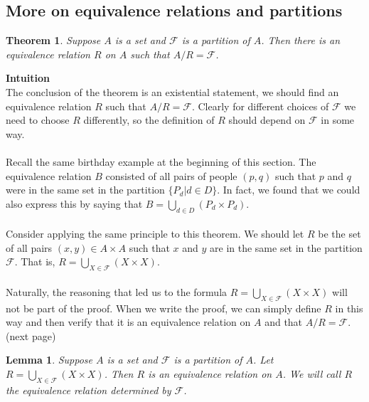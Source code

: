 \documentclass{report}
\newtheorem*{theorem}{Theorem}
\newtheorem*{lemma}{Lemma}
\theoremstyle{definition}
\begin{document}
\subsection{More on equivalence relations and partitions}
\begin{theorem}
Suppose $A$ is a set and $\mathcal F$ is a partition of $A$. Then there is an equivalence relation $R$ on $A$ such that $A/R=\mathcal F$.
\end{theorem}
\noindent\textbf{Intuition}\\
The conclusion of the theorem is an existential statement, we should find an equivalence relation $R$ such that $A/R=\mathcal F$. Clearly for different choices
of $\mathcal F$ we need to choose $R$ differently, so the definition of $R$ should depend on $\mathcal F$ in some way.\\
\vspace{1mm}\\
Recall the same birthday example at the beginning of this section. The equivalence relation $B$ consisted of all pairs of people $(p,q)$ such that $p$ and $q$ were in the same set in the partition
$\{P_d|d\in D\}$. In fact, we found that we could also express this by saying that $B=\bigcup_{d\in D}(P_d\times P_d)$.\\
\vspace{1mm}\\
Consider applying the same principle to this theorem. We should let $R$ be the set of all pairs $(x,y)\in A\times A$ such that $x$ and $y$ are in the same set in the partition $\mathcal F$. That is,
$R=\bigcup_{X\in\mathcal F}(X\times X)$.\\
\vspace{1mm}\\
Naturally, the reasoning that led us to the formula $R=\bigcup_{X\in\mathcal F}(X\times X)$ will not be part of the proof. When we write the proof, we can simply define $R$ in this way
and then verify that it is an equivalence relation on $A$ and that $A/R=\mathcal F$.\\
(next page)\newpage
\begin{lemma}
Suppose $A$ is a set and $\mathcal F$ is a partition of $A$. Let $R=\bigcup_{X\in\mathcal F}(X\times X)$. Then $R$ is an equivalence relation on $A$. We will call $R$ the equivalence relation
determined by $\mathcal F$.
\end{lemma}
\end{document}
